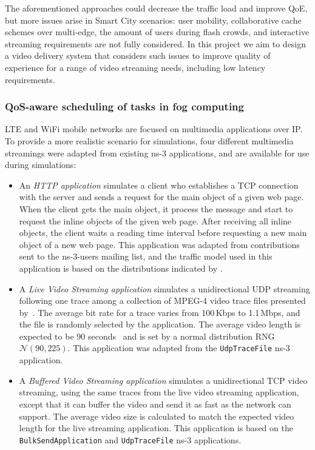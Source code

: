 The aforementioned approaches could decrease the traffic load and improve QoE, but more
issues arise in Smart City scenarios: user mobility, collaborative cache schemes over multi-edge,
the amount of users during flash crowds, and interactive streaming requirements are not fully
considered. In this project we aim to design a video delivery system that considers such issues
to improve quality of experience for a range of video streaming needs, including low latency
requirements.

\subsubsection{QoS-aware scheduling of tasks in fog computing}
\label{subsec:applications}




\ac{LTE} and WiFi mobile networks are focused on multimedia
applications over \ac{IP}. To provide a more realistic scenario for
simulations, four different multimedia streamings were adapted from
existing \ac{ns-3} applications, and are available for use during simulations:
\begin{itemize}
  \item An \emph{\ac{HTTP} application} simulates a client who establishes a
  \ac{TCP} connection with the server and sends a request for the main object
  of a given web page. When the client gets the main object, it process the
  message and start to request the inline objects of the given web page. After
  receiving all inline objects, the client waits a reading time interval before
  requesting a new main object of a new web page. This application was adapted
  from contributions sent to the ns-3-users mailing list, and the traffic model
  used in this application is based on the distributions indicated by
  \citet{Pries2012}.

  \item A \emph{Live Video Streaming application} simulates a unidirectional
  \ac{UDP} streaming following one trace among a collection of \acs{MPEG}-4
  video trace files presented by~\citet{Fitzek2001}. The average bit rate for a
  trace varies from 100\,Kbps to 1.1\,Mbps, and the file is randomly selected
  by the application. The average video length is expected to be 90
  seconds~\cite{youtubeStats} and is set by a normal distribution \ac{RNG}
  $\mathcal{N}(90,225)$. This application was adapted from the
  \texttt{UdpTraceFile} \ac{ns-3} application.

  \item A \emph{Buffered Video Streaming application} simulates a
  unidirectional \ac{TCP} video streaming, using the same traces from the live
  video streaming application, except that it can buffer the video and send it
  as fast as the network can support. The average video size is calculated to
  match the expected video length for the live streaming application. This
  application is based on the \texttt{BulkSendApplication} and
  \texttt{UdpTraceFile} \ac{ns-3} applications.
\end{itemize}

